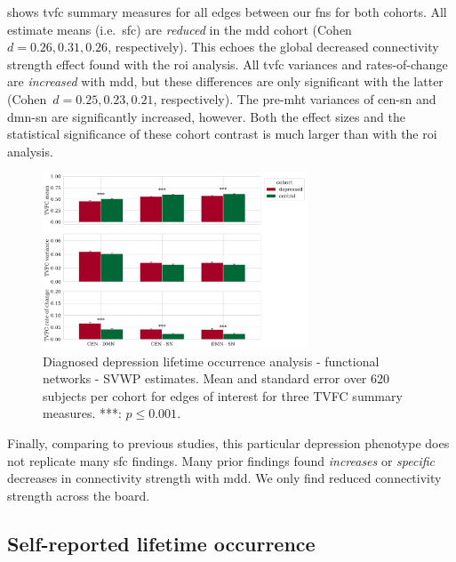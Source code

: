  shows \gls{tvfc} summary measures for all edges between our \glspl{fn} for both cohorts.
%
All estimate means (i.e.~\gls{sfc}) are \emph{reduced} in the \gls{mdd} cohort (Cohen~$d = 0.26, 0.31, 0.26$, respectively).
This echoes the global decreased connectivity strength effect found with the \gls{roi} analysis.
%
All \gls{tvfc} variances and rates-of-change are \emph{increased} with \gls{mdd}, but these differences are only significant with the latter (Cohen~$d = 0.25, 0.23, 0.21$, respectively).
The pre-\gls{mht} variances of \gls{cen}-\gls{sn} and \gls{dmn}-\gls{sn} are significantly increased, however.
Both the effect sizes and the statistical significance of these cohort contrast is much larger than with the \gls{roi} analysis.


\begin{figure}[ht]
  \centering
  \includegraphics[width=0.7\textwidth]{fig/ukbiobank/TVFC_predictions_summaries/diagnosed_lifetime_occurrence/cohort_comparison/FN/correlation_all_TVFC_summary_measures_SVWP_joint_edges_of_interest}
  \caption{
    Diagnosed depression lifetime occurrence analysis - functional networks - SVWP estimates.
    Mean and standard error over 620 subjects per cohort for edges of interest for three TVFC summary measures.
    ***: $p \leq 0.001$.
  }
  \label{fig:ukb-results-dlo-fn-cohort-comparison-edges-of-interest-wp}
\end{figure}


Finally, comparing to previous studies, this particular depression phenotype does not replicate many \gls{sfc} findings.
Many prior findings found \emph{increases} or \emph{specific} decreases in connectivity strength with \gls{mdd}.
We only find reduced connectivity strength across the board.

\clearpage
\subsection{Self-reported lifetime occurrence}

